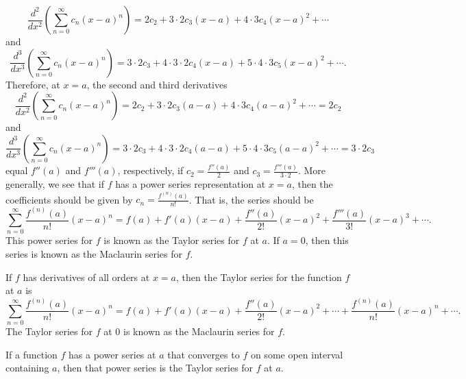 \documentclass{report}
\begin{document}
    \begin{equation}
        \frac{d^2}{dx^2}\left(\sum_{n=0}^{\infty} c_n(x-a)^n\right) = 2c_2 + 3 \cdot 2c_3(x-a) + 4 \cdot 3c_4(x-a)^2 + \cdots
    \end{equation}
    and
    \begin{equation}
        \frac{d^3}{dx^3}\left(\sum_{n=0}^{\infty} c_n(x-a)^n\right) = 3 \cdot 2c_3 + 4 \cdot 3 \cdot 2c_4(x-a) + 5 \cdot 4 \cdot 3c_5(x-a)^2 + \cdots.
    \end{equation}
    Therefore, at $x=a$, the second and third derivatives
    \begin{equation}
        \frac{d^2}{dx^2}\left(\sum_{n=0}^{\infty} c_n(x-a)^n\right) = 2c_2 + 3 \cdot 2c_3(a-a) + 4 \cdot 3c_4(a-a)^2 + \cdots = 2c_2
    \end{equation}
    and
    \begin{equation}
        \frac{d^3}{dx^3}\left(\sum_{n=0}^{\infty} c_n(x-a)^n\right) = 3 \cdot 2c_3 + 4 \cdot 3 \cdot 2c_4(a-a) + 5 \cdot 4 \cdot 3c_5(a-a)^2 + \cdots = 3 \cdot 2c_3
    \end{equation}
    equal $f''(a)$ and $f'''(a)$, respectively, if $c_2 = \frac{f''(a)}{2}$ and $c_3 = \frac{f'''(a)}{3 \cdot 2}$. More generally, we see that if $f$ has a power series representation at $x=a$, then the coefficients should be given by $c_n = \frac{f^{(n)}(a)}{n!}$. That is, the series should be
    \begin{equation}
        \sum_{n=0}^{\infty} \frac{f^{(n)}(a)}{n!}(x-a)^n = f(a) + f'(a)(x-a) + \frac{f''(a)}{2!}(x-a)^2 + \frac{f'''(a)}{3!}(x-a)^3 + \cdots.
    \end{equation}
    This power series for $f$ is known as the Taylor series for $f$ at $a$. If $a=0$, then this series is known as the Maclaurin series for $f$.
    \pagebreak 
    \begin{dfn}
        If $f$ has derivatives of all orders at $x=a$, then the Taylor series for the function $f$ at $a$ is
        \begin{equation}
            \sum_{n=0}^{\infty} \frac{f^{(n)}(a)}{n!}(x-a)^n = f(a) + f'(a)(x-a) + \frac{f''(a)}{2!}(x-a)^2 + \cdots + \frac{f^{(n)}(a)}{n!}(x-a)^n + \cdots.
        \end{equation}
        The Taylor series for $f$ at $0$ is known as the Maclaurin series for $f$.
    \end{dfn}
    \begin{thrmm}
        If a function $f$ has a power series at $a$ that converges to $f$ on some open interval containing $a$, then that power series is the Taylor series for $f$ at $a$.
    \end{thrmm}
    \bigbreak \noindent 
\end{document}
